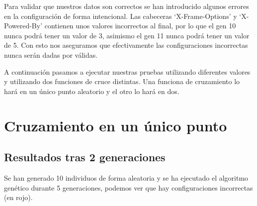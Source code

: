 \bigskip
Para validar que nuestros datos son correctos se han introducido algunos errores en la configuración de forma intencional. Las cabeceras `X-Frame-Options' y `X-Powered-By' contienen unos valores incorrectos al final, por lo que el gen 10 nunca podrá tener un valor de 3, asimismo el gen 11 nunca podrá tener un valor de 5. Con esto nos aseguramos que efectivamente las configuraciones incorrectas nunca serán dadas por válidas.

\bigskip
A continuación pasamos a ejecutar nuestras pruebas utilizando diferentes valores y utilizando dos funciones de cruce distintas. Una funciona de cruzamiento lo hará en un único punto aleatorio y el otro lo hará en dos.

\section{Cruzamiento en un único punto}

\subsection{Resultados tras 2 generaciones}

Se han generado 10 individuos de forma aleatoria y se ha ejecutado el algoritmo genético durante 5 generaciones, podemos ver que hay configuraciones incorrectas (en rojo).

